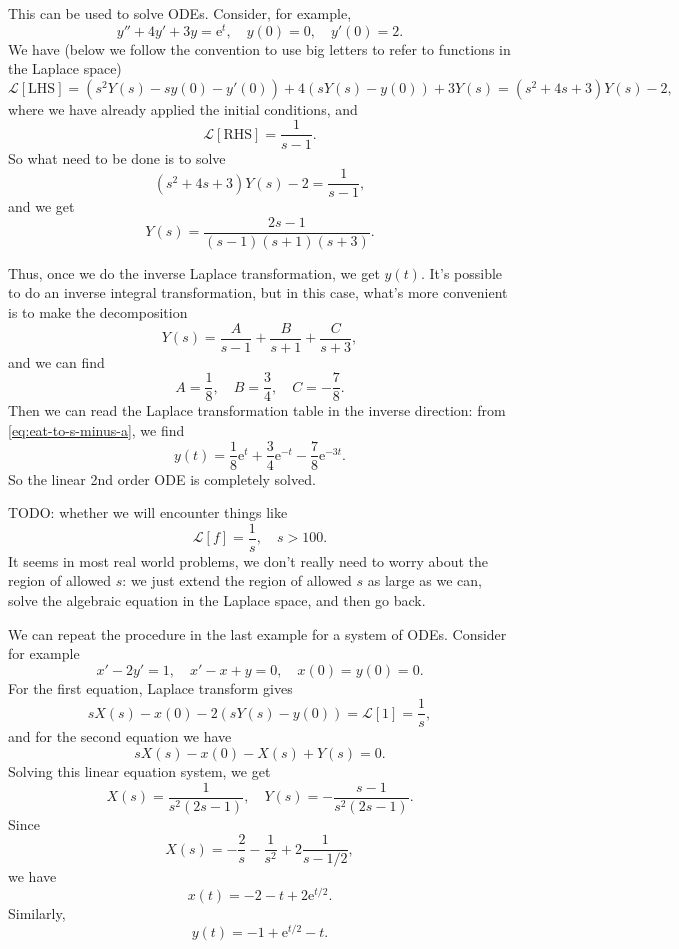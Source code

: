 \documentclass[hyperref, a4paper]{article}
\newcommand*{\ee}{\mathrm{e}}
\newcommand*{\laplace}{\mathcal{L}}
\begin{document}
This can be used to solve ODEs. 
Consider, for example, 
\begin{equation}
    y'' + 4y' + 3y = \ee^{t}, \quad 
    y(0) = 0, \quad y'(0) = 2.
\end{equation}
We have (below we follow the convention to use big letters to refer to functions in the Laplace space)
\[
    \laplace[\text{LHS}] = 
    (s^2 Y(s) - s y(0) - y'(0))
    + 4 (s Y(s) - y(0))
    + 3 Y(s) = 
    (s^2 + 4s + 3) Y(s) - 2,
\]
where we have already applied the initial conditions, 
and 
\[
    \laplace[\text{RHS}] = \frac{1}{s-1}.
\]
So what need to be done is to solve 
\[
    (s^2 + 4s + 3) Y(s) - 2 = \frac{1}{s - 1},
\]
and we get 
\begin{equation}
    Y(s) = \frac{2s-1}{(s-1) (s+1) (s+3)}.
\end{equation}

Thus, once we do the inverse Laplace transformation, 
we get $y(t)$. 
It's possible to do an inverse integral transformation,
but in this case, what's more convenient is to make the decomposition 
\[
    Y(s) = \frac{A}{s - 1} + \frac{B}{s + 1} + \frac{C}{s + 3},
\]
and we can find 
\[
    A = \frac{1}{8}, \quad B = \frac{3}{4}, \quad C = - \frac{7}{8}.
\]
Then we can read the Laplace transformation table in the inverse direction:
from \eqref{eq:eat-to-s-minus-a}, 
we find 
\begin{equation}
    y(t) = \frac{1}{8} \ee^{t} + \frac{3}{4} \ee^{-t} - \frac{7}{8} \ee^{-3t}.
\end{equation}
So the linear 2nd order ODE is completely solved. 

TODO: whether we will encounter things like 
\begin{equation}
    \laplace[f] = \frac{1}{s}, \quad s > 100.
\end{equation}
It seems in most real world problems, 
we don't really need to worry about the region of allowed $s$:
we just extend the region of allowed $s$ as large as we can, 
solve the algebraic equation in the Laplace space, 
and then go back. 

We can repeat the procedure in the last example 
for a system of ODEs. 
Consider for example 
\begin{equation}
    x' - 2y' = 1, \quad x' - x + y = 0, \quad x(0) = y(0) = 0.
\end{equation}
For the first equation, Laplace transform gives 
\[
    s X(s) - x(0) - 2 (s Y(s) - y(0)) = \laplace[1] = \frac{1}{s},
\]
and for the second equation we have 
\[
    s X(s) - x(0) - X(s) + Y(s) = 0.
\]
Solving this linear equation system, we get 
\[
    X(s) = \frac{1}{s^2 (2s - 1)}, \quad 
    Y(s) = - \frac{s-1}{s^2 (2s - 1)}.
\]
Since 
\[
    X(s) = - \frac{2}{s} - \frac{1}{s^2} + 2 \frac{1}{s-1/2},
\]
we have 
\begin{equation}
    x(t) = - 2 - t + 2 \ee^{t/2}.
\end{equation}
Similarly, 
\begin{equation}
    y(t) = -1 + \ee^{t/2} - t.
\end{equation}
\end{document}
